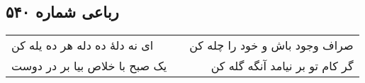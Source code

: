 \begin{center}
\section*{رباعی شماره ۵۴۰}
\label{sec:sh540}
\begin{longtable}{l p{0.5cm} r}
ای نه دلهٔ ده دله هر ده یله کن
&&
صراف وجود باش و خود را چله کن
\\
یک صبح با خلاص بیا بر در دوست
&&
گر کام تو بر نیامد آنگه گله کن
\\
\end{longtable}
\end{center}
